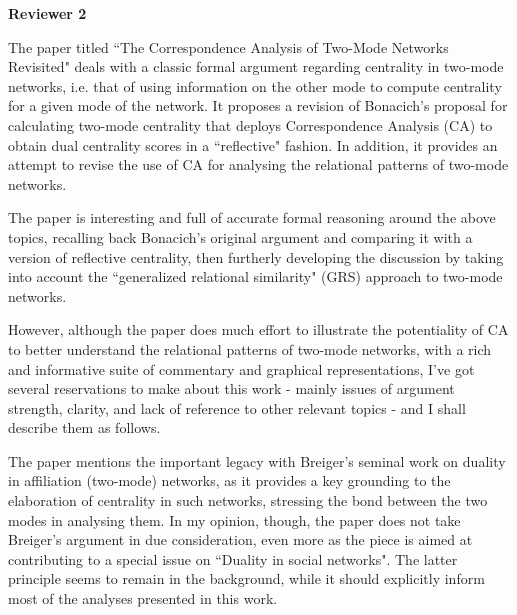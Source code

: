 \documentclass[]{letter}
\begin{document}
\textbf{Reviewer 2}

The paper titled ``The Correspondence Analysis of Two-Mode Networks Revisited" deals with a classic formal argument regarding centrality in two-mode networks, i.e. that of using information on the other mode to compute centrality for a given mode of the network. It proposes a revision of Bonacich's proposal for calculating two-mode centrality that deploys Correspondence Analysis (CA) to obtain dual centrality scores in a ``reflective" fashion. In addition, it provides an attempt to revise the use of CA for analysing the relational patterns of two-mode networks.

The paper is interesting and full of accurate formal reasoning around the above topics, recalling back Bonacich's original argument and comparing it with a version of reflective centrality, then furtherly developing the discussion by taking into account the ``generalized relational similarity" (GRS) approach to two-mode networks.

However, although the paper does much effort to illustrate the potentiality of CA to better understand the relational patterns of two-mode networks, with a rich and informative suite of commentary and graphical representations, I've got several reservations to make about this work - mainly issues of argument strength, clarity, and lack of reference to other relevant topics - and I shall describe them as follows.

The paper mentions the important legacy with Breiger's seminal work on duality in affiliation (two-mode) networks, as it provides a key grounding to the elaboration of centrality in such networks, stressing the bond between the two modes in analysing them. In my opinion, though, the paper does not take Breiger's argument in due consideration, even more as the piece is aimed at contributing to a special issue on ``Duality in social networks". The latter principle seems to remain in the background, while it should explicitly inform most of the analyses presented in this work.
\end{document}

